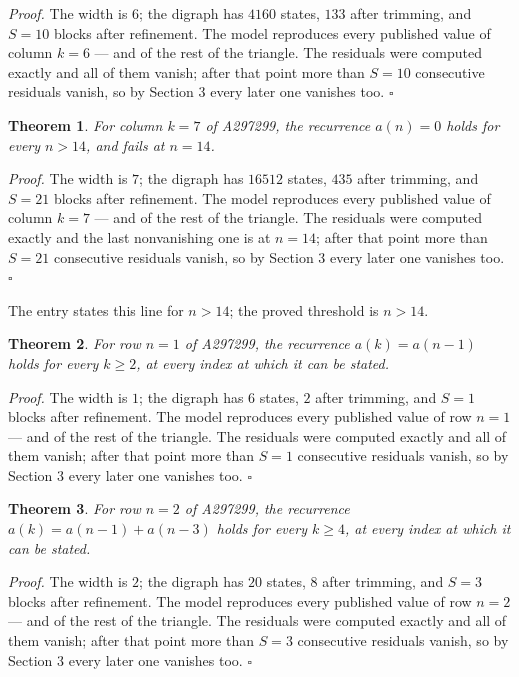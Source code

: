 \documentclass[11pt]{article}
\newtheorem{theorem}{Theorem}
\theoremstyle{definition}
\begin{document}
{\itshape Proof.} The width is $6$; the digraph has $4160$ states, $133$ after trimming, and $S = 10$ blocks after refinement. The model reproduces every published value of column $k = 6$ --- and of the rest of the triangle. The residuals were computed exactly and all of them vanish; after that point more than $S = 10$ consecutive residuals vanish, so by Section 3 every later one vanishes too. $\square$

\begin{theorem} For column $k = 7$ of A297299, the recurrence $a(n) = 0$ holds for every $n > 14$, and fails at $n = 14$.\end{theorem}

{\itshape Proof.} The width is $7$; the digraph has $16512$ states, $435$ after trimming, and $S = 21$ blocks after refinement. The model reproduces every published value of column $k = 7$ --- and of the rest of the triangle. The residuals were computed exactly and the last nonvanishing one is at $n = 14$; after that point more than $S = 21$ consecutive residuals vanish, so by Section 3 every later one vanishes too. $\square$

The entry states this line for $n > 14$; the proved threshold is $n > 14$.

\begin{theorem} For row $n = 1$ of A297299, the recurrence $a(k) = a(n-1)$ holds for every $k \ge 2$, at every index at which it can be stated.\end{theorem}

{\itshape Proof.} The width is $1$; the digraph has $6$ states, $2$ after trimming, and $S = 1$ blocks after refinement. The model reproduces every published value of row $n = 1$ --- and of the rest of the triangle. The residuals were computed exactly and all of them vanish; after that point more than $S = 1$ consecutive residuals vanish, so by Section 3 every later one vanishes too. $\square$

\begin{theorem} For row $n = 2$ of A297299, the recurrence $a(k) = a(n-1) + a(n-3)$ holds for every $k \ge 4$, at every index at which it can be stated.\end{theorem}

{\itshape Proof.} The width is $2$; the digraph has $20$ states, $8$ after trimming, and $S = 3$ blocks after refinement. The model reproduces every published value of row $n = 2$ --- and of the rest of the triangle. The residuals were computed exactly and all of them vanish; after that point more than $S = 3$ consecutive residuals vanish, so by Section 3 every later one vanishes too. $\square$
\end{document}
